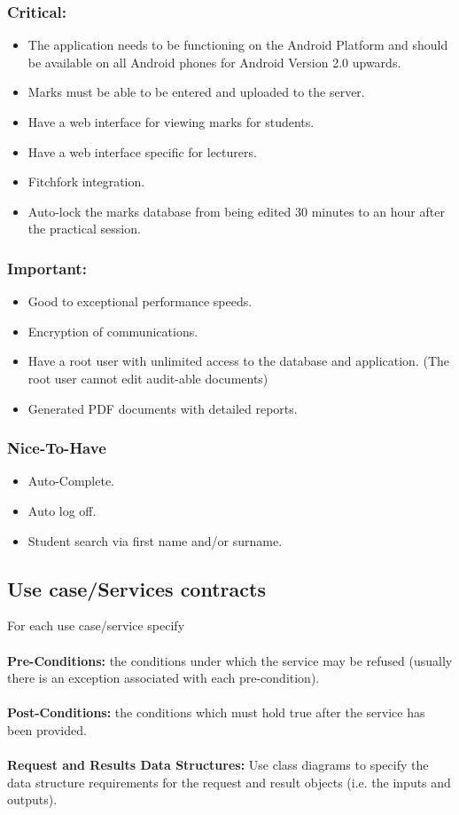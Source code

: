 \documentclass[11pt,a4paper]{article}
\begin{document}
\subsubsection{Critical: }
\begin{itemize}
\item The application needs to be functioning on the Android Platform and should be available on all Android phones for Android Version 2.0 upwards.
\item Marks must be able to be entered and uploaded to the server.
\item Have a web interface for viewing marks for students.
\item Have a web interface specific for lecturers.
\item Fitchfork integration.
\item Auto-lock the marks database from being edited 30 minutes to an hour after the practical session.
\end{itemize}

\subsubsection{Important: } 
\begin{itemize}
\item Good to exceptional performance speeds.
\item Encryption of communications.
\item Have a root user with unlimited access to the database and application. (The root user cannot edit audit-able documents)
\item Generated PDF documents with detailed reports.
\end{itemize}
\subsubsection{Nice-To-Have} 
\begin{itemize}
\item Auto-Complete.
\item Auto log off.
\item Student search via first name and/or surname.
\end{itemize}

\subsection{Use case/Services contracts}
For each use case/service specify
\\\\
\textbf{Pre-Conditions: }the conditions under which the service may be refused (usually there is an exception associated with each pre-condition).
\\\\
\textbf{Post-Conditions: }the conditions which must hold true after the service has been provided.
\\\\
\textbf{Request and Results Data Structures: }Use class diagrams to specify the data structure requirements for the request and result objects (i.e. the inputs and outputs).
\end{document}
